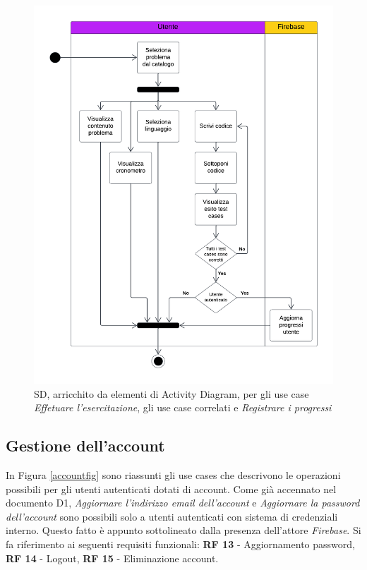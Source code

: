 \documentclass[11pt, a4paper]{article}
\theoremstyle{definition} %
\begin{document}
\begin{figure}[H]
\centering
\includegraphics[scale=0.65]{materiale/ucdiagrams/swimlaneesercitazione.pdf}
\caption{SD, arricchito da elementi di Activity Diagram,
per gli use case \textit{Effetuare l'esercitazione}, gli use case correlati
e \textit{Registrare i progressi}}
\label{acexercise}
\end{figure}


\newpage
\subsection{Gestione dell'account}
In Figura \ref{accountfig} sono riassunti gli use cases che descrivono
le operazioni possibili per gli utenti autenticati dotati di account. Come già accennato
nel documento D1, \textit{Aggiornare l'indirizzo email dell'account} e
\textit{Aggiornare la password dell'account} sono possibili solo a utenti
autenticati con sistema di credenziali interno. Questo fatto è appunto
sottolineato dalla presenza dell'attore \textit{Firebase}. Si fa riferimento
ai seguenti requisiti funzionali:
\textbf{RF 13} - Aggiornamento password, \textbf{RF 14} - Logout,
\textbf{RF 15} - Eliminazione account.
\end{document}
